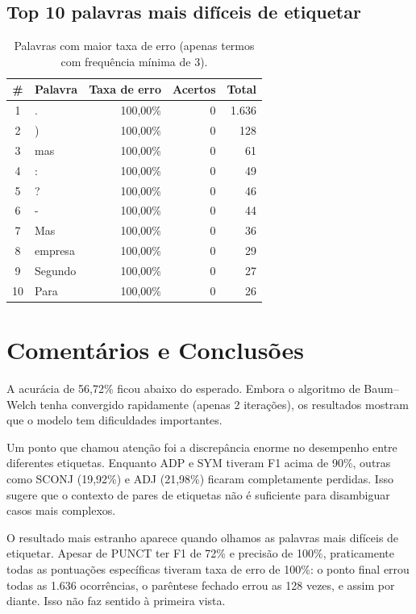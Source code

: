 \documentclass[12pt,a4paper]{article}
\begin{document}
\subsection{Top 10 palavras mais difíceis de etiquetar}

\begin{table}[H]
\centering
\begin{tabular}{clrrr}
\toprule
\textbf{\#} & \textbf{Palavra} & \textbf{Taxa de erro} & \textbf{Acertos} & \textbf{Total} \\
\midrule
1 & .        & 100,00\% & 0 & 1.636 \\
2 & )        & 100,00\% & 0 & 128 \\
3 & mas      & 100,00\% & 0 & 61 \\
4 & :        & 100,00\% & 0 & 49 \\
5 & ?        & 100,00\% & 0 & 46 \\
6 & -        & 100,00\% & 0 & 44 \\
7 & Mas      & 100,00\% & 0 & 36 \\
8 & empresa  & 100,00\% & 0 & 29 \\
9 & Segundo  & 100,00\% & 0 & 27 \\
10 & Para    & 100,00\% & 0 & 26 \\
\bottomrule
\end{tabular}
\caption{Palavras com maior taxa de erro (apenas termos com frequência mínima de 3).}
\end{table}

\section{Comentários e Conclusões}

A acurácia de 56,72\% ficou abaixo do esperado. Embora o algoritmo de Baum--Welch tenha convergido rapidamente (apenas 2 iterações), os resultados mostram que o modelo tem dificuldades importantes.

Um ponto que chamou atenção foi a discrepância enorme no desempenho entre diferentes etiquetas. Enquanto ADP e SYM tiveram F1 acima de 90\%, outras como SCONJ (19,92\%) e ADJ (21,98\%) ficaram completamente perdidas. Isso sugere que o contexto de pares de etiquetas não é suficiente para disambiguar casos mais complexos.

O resultado mais estranho aparece quando olhamos as palavras mais difíceis de etiquetar. Apesar de PUNCT ter F1 de 72\% e precisão de 100\%, praticamente todas as pontuações específicas tiveram taxa de erro de 100\%: o ponto final errou todas as 1.636 ocorrências, o parêntese fechado errou as 128 vezes, e assim por diante. Isso não faz sentido à primeira vista.
\end{document}

